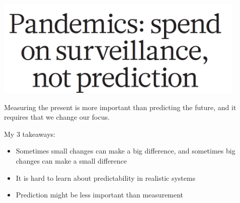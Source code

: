 \documentclass[aspectratio=169]{beamer}
\begin{document}
\begin{frame}

\begin{center}
\includegraphics[width = 0.9\textwidth]{figures/holmes_pandemics_2018_title}
\end{center}

\vfill
Measuring the present is more important than predicting the future, and it requires that we change our focus.

\end{frame}
\begin{frame}

My 3 takeaways:
\begin{itemize}
\item Sometimes small changes can make a big difference, and sometimes big changes can make a small difference
\pause
\item It is hard to learn about predictability in realistic systems
\pause
\item Prediction might be less important than measurement
\end{itemize}

\end{frame}
\frame{\titlepage}
\end{document}
